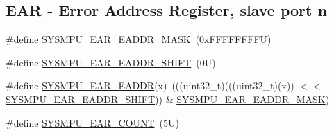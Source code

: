 \subsection*{E\+AR -\/ Error Address Register, slave port n}
\begin{DoxyCompactItemize}
\item 
\#define \mbox{\hyperlink{group___s_y_s_m_p_u___register___masks_gad9947bf32f168be3db5227b84ce9f469}{S\+Y\+S\+M\+P\+U\+\_\+\+E\+A\+R\+\_\+\+E\+A\+D\+D\+R\+\_\+\+M\+A\+SK}}~(0x\+F\+F\+F\+F\+F\+F\+F\+F\+U)
\item 
\#define \mbox{\hyperlink{group___s_y_s_m_p_u___register___masks_ga140e9532d599f77863a509b01cead499}{S\+Y\+S\+M\+P\+U\+\_\+\+E\+A\+R\+\_\+\+E\+A\+D\+D\+R\+\_\+\+S\+H\+I\+FT}}~(0\+U)
\item 
\#define \mbox{\hyperlink{group___s_y_s_m_p_u___register___masks_ga6eaaa6e1fdc2cb2bb525f28d889beb72}{S\+Y\+S\+M\+P\+U\+\_\+\+E\+A\+R\+\_\+\+E\+A\+D\+DR}}(x)~(((uint32\+\_\+t)(((uint32\+\_\+t)(x)) $<$$<$ \mbox{\hyperlink{group___s_y_s_m_p_u___register___masks_ga140e9532d599f77863a509b01cead499}{S\+Y\+S\+M\+P\+U\+\_\+\+E\+A\+R\+\_\+\+E\+A\+D\+D\+R\+\_\+\+S\+H\+I\+FT}})) \& \mbox{\hyperlink{group___s_y_s_m_p_u___register___masks_gad9947bf32f168be3db5227b84ce9f469}{S\+Y\+S\+M\+P\+U\+\_\+\+E\+A\+R\+\_\+\+E\+A\+D\+D\+R\+\_\+\+M\+A\+SK}})
\item 
\#define \mbox{\hyperlink{group___s_y_s_m_p_u___register___masks_gac8eefc978742488f304f6e076d472423}{S\+Y\+S\+M\+P\+U\+\_\+\+E\+A\+R\+\_\+\+C\+O\+U\+NT}}~(5\+U)
\end{DoxyCompactItemize}
